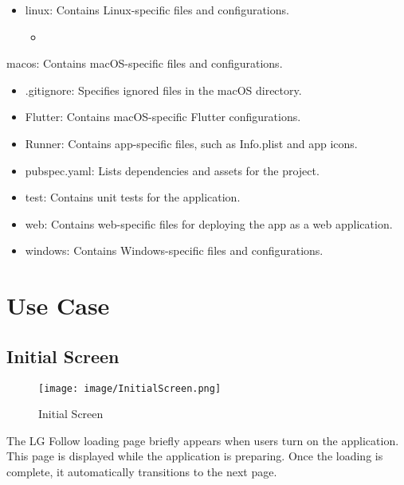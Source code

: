 \documentclass[conference]{IEEEtran}
\begin{document}
\begin{itemize}
    \item linux: Contains Linux-specific files and configurations.
\begin{itemize}
    \item 
\end{itemize}
\end{itemize}
    \item macos: Contains macOS-specific files and configurations.
    \begin{itemize}
        \item .gitignore: Specifies ignored files in the macOS directory. \\
        \item Flutter: Contains macOS-specific Flutter configurations. \\
        \item Runner: Contains app-specific files, such as Info.plist and app icons. \\
    \end{itemize}
\begin{itemize}
    \item pubspec.yaml: Lists dependencies and assets for the project. \\
    \item test: Contains unit tests for the application. \\
    \item web: Contains web-specific files for deploying the app as a web application. \\
    \item windows: Contains Windows-specific files and configurations. \\
\end{itemize}

\section{Use Case}

\subsection{Initial Screen}
\begin{figure}[h!]
    \centering
    \texttt{[image: image/InitialScreen.png]}
    \caption{Initial Screen}
    \label{fig:enter-label}
\end{figure}

\noindent The LG Follow loading page briefly appears when users turn on the application. This page is displayed while the application is preparing. Once the loading is complete, it automatically transitions to the next page.\\
\end{document}
